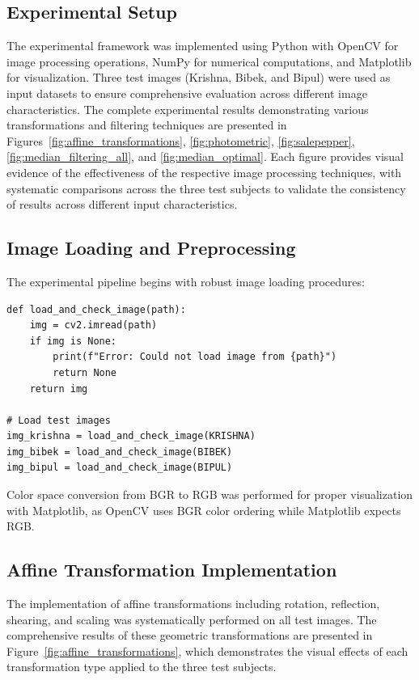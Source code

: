 \documentclass[a4paper, journal]{IEEEtran}
\begin{document}
\subsection{Experimental Setup}
The experimental framework was implemented using Python with OpenCV for image processing operations, NumPy for numerical computations, and Matplotlib for visualization. Three test images (Krishna, Bibek, and Bipul) were used as input datasets to ensure comprehensive evaluation across different image characteristics. The complete experimental results demonstrating various transformations and filtering techniques are presented in Figures~\ref{fig:affine_transformations}, \ref{fig:photometric}, \ref{fig:salepepper}, \ref{fig:median_filtering_all}, and \ref{fig:median_optimal}. Each figure provides visual evidence of the effectiveness of the respective image processing techniques, with systematic comparisons across the three test subjects to validate the consistency of results across different input characteristics.

\subsection{Image Loading and Preprocessing}
The experimental pipeline begins with robust image loading procedures:

\begin{lstlisting}[caption=Image Loading and Validation]
def load_and_check_image(path):
    img = cv2.imread(path)
    if img is None:
        print(f"Error: Could not load image from {path}")
        return None
    return img

# Load test images
img_krishna = load_and_check_image(KRISHNA)
img_bibek = load_and_check_image(BIBEK)  
img_bipul = load_and_check_image(BIPUL)
\end{lstlisting}

Color space conversion from BGR to RGB was performed for proper visualization with Matplotlib, as OpenCV uses BGR color ordering while Matplotlib expects RGB.

\subsection{Affine Transformation Implementation}

The implementation of affine transformations including rotation, reflection, shearing, and scaling was systematically performed on all test images. The comprehensive results of these geometric transformations are presented in Figure~\ref{fig:affine_transformations}, which demonstrates the visual effects of each transformation type applied to the three test subjects.
\end{document}
